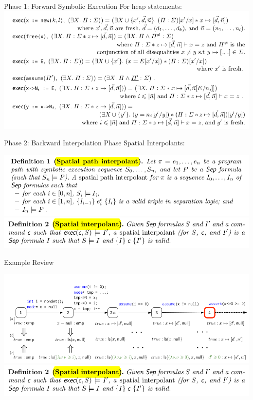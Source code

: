 \documentclass[aspectratio=1610, 13pt]{beamer}
\begin{document}
\begin{frame}{Phase 1: Forward Symbolic Execution}
For heap statements:
\includegraphics[scale=0.4]{17.png}
\end{frame}
\begin{frame}{Phase 2: Backward Interpolation Phase}
Spatial Interpolants:
\begin{center}

\includegraphics[scale=0.4]{18.png}
\includegraphics[scale=0.4]{19.png}
\end{center}


\end{frame}

\begin{frame}{Example Review}

\includegraphics[scale=0.4]{9.png}
\includegraphics[scale=0.4]{19.png}
\end{frame}
\end{document}
